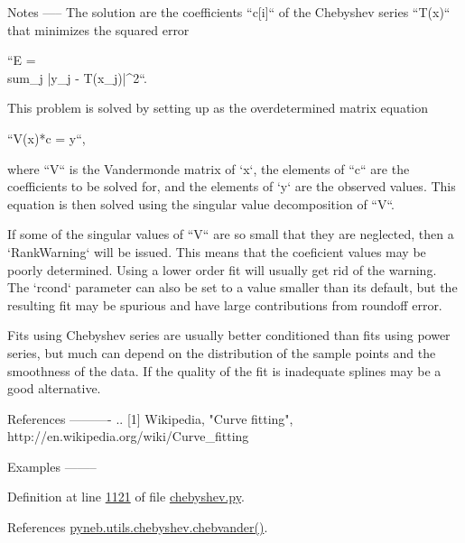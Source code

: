 \begin{DoxyVerb}
Notes
-----
The solution are the coefficients ``c[i]`` of the Chebyshev series
``T(x)`` that minimizes the squared error

``E = \\sum_j |y_j - T(x_j)|^2``.

This problem is solved by setting up as the overdetermined matrix
equation

``V(x)*c = y``,

where ``V`` is the Vandermonde matrix of `x`, the elements of ``c`` are
the coefficients to be solved for, and the elements of `y` are the
observed values.  This equation is then solved using the singular value
decomposition of ``V``.

If some of the singular values of ``V`` are so small that they are
neglected, then a `RankWarning` will be issued. This means that the
coeficient values may be poorly determined. Using a lower order fit
will usually get rid of the warning.  The `rcond` parameter can also be
set to a value smaller than its default, but the resulting fit may be
spurious and have large contributions from roundoff error.

Fits using Chebyshev series are usually better conditioned than fits
using power series, but much can depend on the distribution of the
sample points and the smoothness of the data. If the quality of the fit
is inadequate splines may be a good alternative.

References
----------
.. [1] Wikipedia, "Curve fitting",
       http://en.wikipedia.org/wiki/Curve_fitting

Examples
--------\end{DoxyVerb}
 

Definition at line \hyperlink{chebyshev_8py_source_l01121}{1121} of file \hyperlink{chebyshev_8py_source}{chebyshev.\+py}.



References \hyperlink{chebyshev_8py_source_l01078}{pyneb.\+utils.\+chebyshev.\+chebvander()}.


